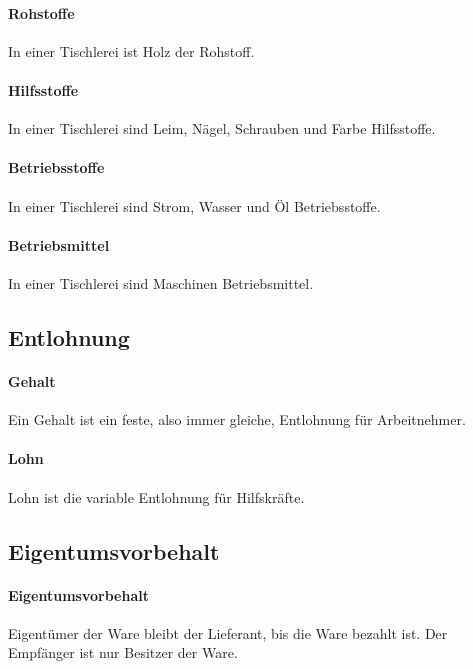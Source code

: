 \documentclass[../main.tex]{subfiles}
\begin{document}
            \paragraph{Rohstoffe}
                In einer Tischlerei ist Holz der Rohstoff.
                
            \paragraph{Hilfsstoffe}
                In einer Tischlerei sind Leim, Nägel, Schrauben und Farbe Hilfsstoffe.
                
            \paragraph{Betriebsstoffe}
                In einer Tischlerei sind Strom, Wasser und Öl Betriebsstoffe.
                
            \paragraph{Betriebsmittel}
                In einer Tischlerei sind Maschinen Betriebsmittel.

        \subsection{Entlohnung}            
            \paragraph{Gehalt}
                Ein Gehalt ist ein feste, also immer gleiche, Entlohnung für Arbeitnehmer.
                
            \paragraph{Lohn}
                Lohn ist die variable Entlohnung für Hilfskräfte.
                
        \subsection{Eigentumsvorbehalt}
            \paragraph{Eigentumsvorbehalt}
                Eigentümer der Ware bleibt der Lieferant, bis die Ware bezahlt ist. Der Empfänger ist nur Besitzer der Ware.
            
\end{document}
